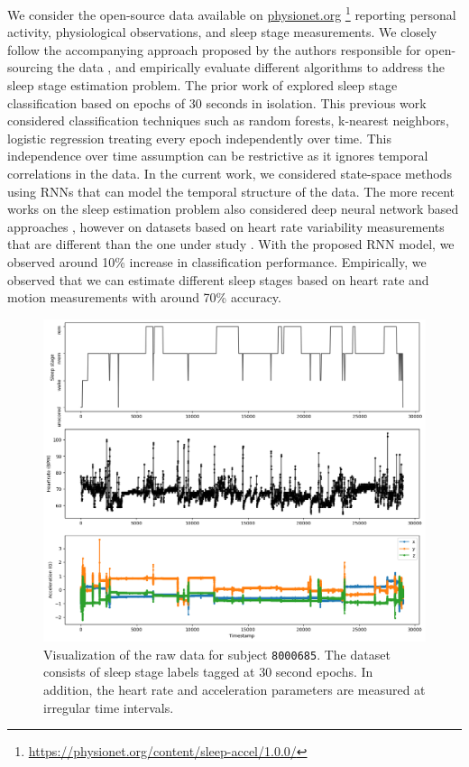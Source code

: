 \documentclass[12pt]{article}
\begin{document}
We consider the open-source data available on \url{physionet.org} \footnote{\label{dataurl}\url{https://physionet.org/content/sleep-accel/1.0.0/}} reporting personal activity, physiological observations, and sleep stage measurements. We closely follow the accompanying approach proposed by the authors responsible for open-sourcing the data  \citep{walch2019}, and empirically evaluate different algorithms to address the sleep stage estimation problem. The prior work of \cite{walch2019} explored sleep stage classification based on epochs of 30 seconds in isolation. This previous work considered classification techniques such as random forests, k-nearest neighbors, logistic regression treating every epoch independently over time. This independence over time assumption can be restrictive as it ignores temporal correlations in the data.  In the current work, we considered state-space methods using RNNs that can model the temporal structure of the data. The more recent works on the sleep estimation problem also considered deep neural network based approaches  \citep{biswal2018expert,radha2019sleep,haghayegh2021deep}, however on datasets based on heart rate variability measurements that are different than the one under study . With the proposed RNN model, we observed around 10\% increase in classification performance. Empirically, we observed that we can estimate different sleep stages based on heart rate and motion measurements with around 70\% accuracy. 


\begin{figure}
\centering
\includegraphics[width=\textwidth]{figures/8000685_cropped.png}
\caption{Visualization of the raw data for subject \texttt{8000685}. The dataset consists of sleep stage labels tagged at 30 second epochs. In addition, the heart rate and acceleration parameters are measured at irregular time intervals.}
\label{fig:8000685_cropped}
\end{figure}
\end{document}
